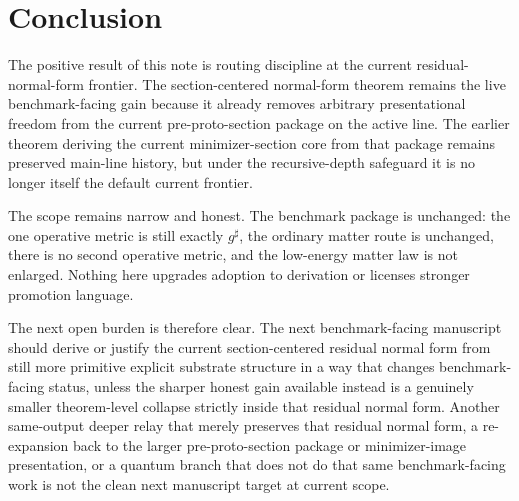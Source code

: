 \documentclass[11pt]{article}
\newcommand{\CompletedMetric}{g^{\sharp}}
\begin{document}
\section{Conclusion}

The positive result of this note is routing discipline at the current residual-normal-form frontier. The section-centered normal-form theorem remains the live benchmark-facing gain because it already removes arbitrary presentational freedom from the current pre-proto-section package on the active line. The earlier theorem deriving the current minimizer-section core from that package remains preserved main-line history, but under the recursive-depth safeguard it is no longer itself the default current frontier.

The scope remains narrow and honest. The benchmark package is unchanged: the one operative metric is still exactly \(\CompletedMetric\), the ordinary matter route is unchanged, there is no second operative metric, and the low-energy matter law is not enlarged. Nothing here upgrades adoption to derivation or licenses stronger promotion language.

The next open burden is therefore clear. The next benchmark-facing manuscript should derive or justify the current section-centered residual normal form from still more primitive explicit substrate structure in a way that changes benchmark-facing status, unless the sharper honest gain available instead is a genuinely smaller theorem-level collapse strictly inside that residual normal form. Another same-output deeper relay that merely preserves that residual normal form, a re-expansion back to the larger pre-proto-section package or minimizer-image presentation, or a quantum branch that does not do that same benchmark-facing work is not the clean next manuscript target at current scope.
\end{document}
